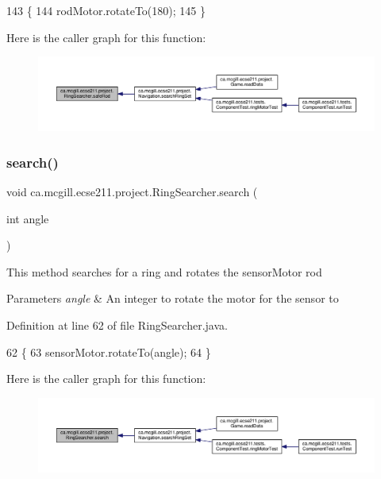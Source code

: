 \begin{DoxyCode}
143                         \{
144     rodMotor.rotateTo(180);
145   \}
\end{DoxyCode}
Here is the caller graph for this function\+:\nopagebreak
\begin{figure}[H]
\begin{center}
\leavevmode
\includegraphics[width=350pt]{classca_1_1mcgill_1_1ecse211_1_1project_1_1_ring_searcher_a0b96c45f7df3eb557496acab33930cd5_icgraph}
\end{center}
\end{figure}
\mbox{\label{classca_1_1mcgill_1_1ecse211_1_1project_1_1_ring_searcher_a6f66df0810034dfb407d792ded013a8e}} 
\subsubsection{\texorpdfstring{search()}{search()}}
{\footnotesize\ttfamily void ca.\+mcgill.\+ecse211.\+project.\+Ring\+Searcher.\+search (\begin{DoxyParamCaption}\item[{int}]{angle }\end{DoxyParamCaption})}

This method searches for a ring and rotates the sensor\+Motor rod


\begin{DoxyParams}{Parameters}
{\em angle} & An integer to rotate the motor for the sensor to \\
\hline
\end{DoxyParams}


Definition at line 62 of file Ring\+Searcher.\+java.


\begin{DoxyCode}
62                                 \{
63     sensorMotor.rotateTo(angle);
64   \}
\end{DoxyCode}
Here is the caller graph for this function\+:\nopagebreak
\begin{figure}[H]
\begin{center}
\leavevmode
\includegraphics[width=350pt]{classca_1_1mcgill_1_1ecse211_1_1project_1_1_ring_searcher_a6f66df0810034dfb407d792ded013a8e_icgraph}
\end{center}
\end{figure}


